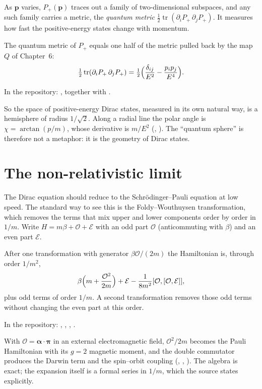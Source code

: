 As $\mathbf p$ varies, $P_+(\mathbf p)$ traces out a family of two-dimensional subspaces, and any such family carries a metric, the \emph{quantum metric} $\tfrac12\operatorname{tr}(\partial_iP_+\,\partial_jP_+)$. It measures how fast the positive-energy states change with momentum.

\begin{theorem}\proved\label{thm:qmetric}
The quantum metric of $P_+$ equals one half of the metric pulled back by the map $Q$ of Chapter~6:
\[
\tfrac12\operatorname{tr}(\partial_iP_+\,\partial_jP_+)=\tfrac12\Bigl(\frac{\delta_{ij}}{E^2}-\frac{p_ip_j}{E^4}\Bigr).
\]
\end{theorem}
\noindent In the repository: , together with .

So the space of positive-energy Dirac states, measured in its own natural way, is a hemisphere of radius $1/\sqrt2$. Along a radial line the polar angle is $\chi=\arctan(p/m)$, whose derivative is $m/E^2$ (, ). The ``quantum sphere'' is therefore not a metaphor: it is the geometry of Dirac states.

\section{The non-relativistic limit}

The Dirac equation should reduce to the Schr\"odinger--Pauli equation at low speed. The standard way to see this is the Foldy--Wouthuysen transformation, which removes the terms that mix upper and lower components order by order in $1/m$. Write $H=m\beta+\mathcal O+\mathcal E$ with an odd part $\mathcal O$ (anticommuting with $\beta$) and an even part $\mathcal E$.

\begin{theorem}\proved\label{thm:fw}
After one transformation with generator $\beta\mathcal O/(2m)$ the Hamiltonian is, through order $1/m^2$,
\[
\beta\Bigl(m+\frac{\mathcal O^2}{2m}\Bigr)+\mathcal E-\frac{1}{8m^2}[\mathcal O,[\mathcal O,\mathcal E]] ,
\]
plus odd terms of order $1/m$. A second transformation removes those odd terms without changing the even part at this order.
\end{theorem}
\noindent In the repository: , , , .

With $\mathcal O=\boldsymbol\alpha\cdot\boldsymbol\pi$ in an external electromagnetic field, $\mathcal O^2/2m$ becomes the Pauli Hamiltonian with its $g=2$ magnetic moment, and the double commutator produces the Darwin term and the spin--orbit coupling (, , ). The algebra is exact; the expansion itself is a formal series in $1/m$, which the source states explicitly.

